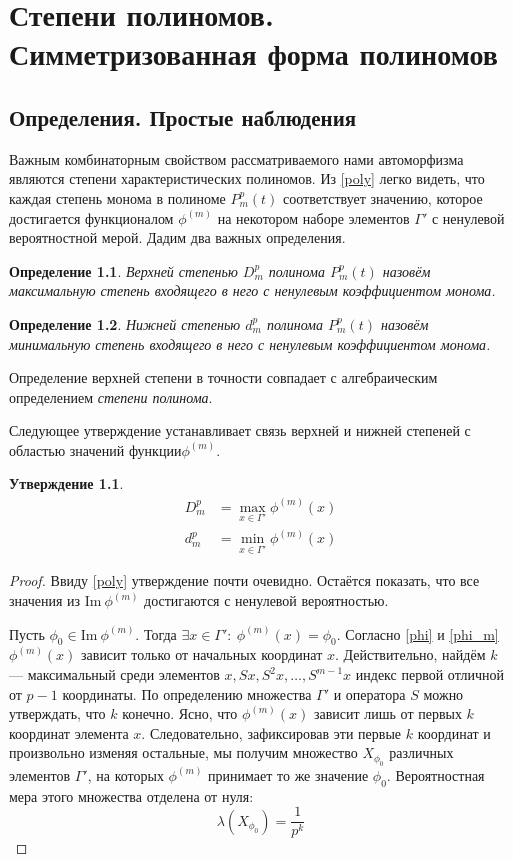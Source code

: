 \documentclass[14pt, a4paper, russian]{report}
\newtheorem{definition}{\indent Определение}
\newtheorem{proposition}{\indent Утверждение}
\begin{document}
\chapter{Степени полиномов. Симметризованная форма полиномов}
\section{Определения. Простые наблюдения}
Важным комбинаторным свойством рассматриваемого нами автоморфизма являются степени характеристических полиномов. Из \cref{poly} легко видеть, что каждая степень монома в полиноме $P_m^p(t)$ соответствует значению, которое достигается функционалом $\phi^{(m)}$ на некотором наборе элементов $\Gamma'$ с ненулевой вероятностной мерой. Дадим два важных определения.
\begin{definition}\label{high_deg}
Верхней степенью $D_m^p$ полинома $P_m^p(t)$ назовём максимальную степень входящего в него с ненулевым коэффициентом монома.
\end{definition}
\begin{definition}\label{low_deg}
Нижней степенью $d_m^p$ полинома $P_m^p(t)$ назовём минимальную степень входящего в него с ненулевым коэффициентом монома.
\end{definition}
Определение верхней степени в точности совпадает с алгебраическим определением \emph{степени полинома}.

Следующее утверждение устанавливает связь верхней и нижней степеней с областью значений функции\nobreakspace$\phi^{(m)}$.
\begin{proposition}
\begin{align*}
D_m^p &= \max\limits_{x \in \Gamma'} \phi^{(m)}(x)\\
d_m^p &= \min\limits_{x \in \Gamma'} \phi^{(m)}(x)
\end{align*}
\end{proposition}
\begin{proof}
Ввиду \cref{poly} утверждение почти очевидно. Остаётся показать, что все значения из $\mathrm{Im\ }\phi^{(m)}$ достигаются с ненулевой вероятностью.

Пусть $\phi_0 \in \mathrm{Im\ }\phi^{(m)}$. Тогда $\exists x \in \Gamma':\ \phi^{(m)}(x) = \phi_0$. Согласно \cref{phi} и \cref{phi_m} $\phi^{(m)}(x)$ зависит только от начальных координат $x$. Действительно, найдём $k$ --- максимальный среди элементов $x, Sx, S^2x, 
\ldots, S^{m-1}x$ индекс первой отличной от $p-1$ координаты. По определению множества $\Gamma'$ и оператора $S$ можно утверждать, что $k$ конечно. Ясно, что $\phi^{(m)}(x)$ зависит лишь от первых $k$ координат элемента $x$. Следовательно, зафиксировав эти первые $k$ координат и произвольно изменяя остальные, мы получим множество $X_{\phi_0}$ различных элементов $\Gamma'$, на которых $\phi^{(m)}$ принимает то же значение $\phi_0$. Вероятностная мера этого множества отделена от нуля: $$\lambda(X_{\phi_0}) = \frac{1}{p^k}$$
\end{proof}
\end{document}
